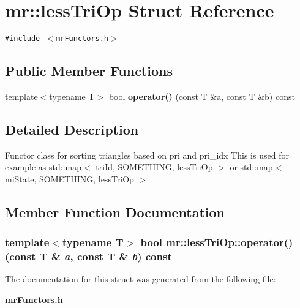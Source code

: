 \section{mr::less\-Tri\-Op Struct Reference}
\label{structmr_1_1lessTriOp}
{\tt \#include $<$mr\-Functors.h$>$}

\subsection*{Public Member Functions}
\begin{CompactItemize}
\item 
template$<$typename T$>$ bool {\bf operator()} (const T \&a, const T \&b) const 
\end{CompactItemize}


\subsection{Detailed Description}
Functor class for sorting triangles based on pri and pri\_\-idx This is used for example as std::map$<$ tri\-Id, SOMETHING, less\-Tri\-Op $>$ or std::map$<$ mi\-State, SOMETHING, less\-Tri\-Op $>$ 



\subsection{Member Function Documentation}
\subsubsection{\setlength{\rightskip}{0pt plus 5cm}template$<$typename T$>$ bool mr::less\-Tri\-Op::operator() (const T \& {\em a}, const T \& {\em b}) const\hspace{0.3cm}{\tt  [inline]}}\label{structmr_1_1lessTriOp_a0}




The documentation for this struct was generated from the following file:\begin{CompactItemize}
\item 
{\bf mr\-Functors.h}\end{CompactItemize}
